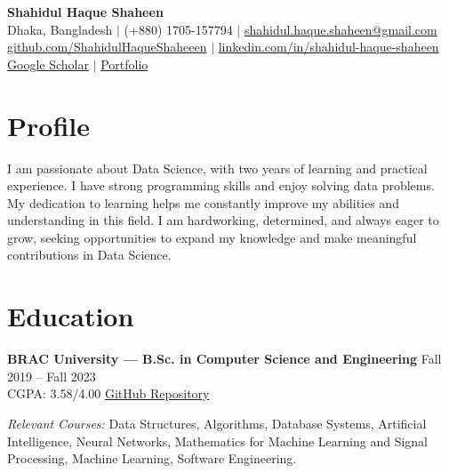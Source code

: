 \documentclass[11.5pt,a4paper]{article}
\begin{document}
\begin{center}
    {\headingfont\Huge \bfseries Shahidul Haque Shaheen}\\[10pt]
    {\normalsize
      Dhaka, Bangladesh \quad $\vert$ \quad
      (+880) 1705-157794 \quad $\vert$ \quad
      \href{mailto:shahidul.haque.shaheen@gmail.com}{shahidul.haque.shaheen@gmail.com} \\[5pt]
      \href{https://github.com/ShahidulHaqueShaheeen}{github.com/ShahidulHaqueShaheeen} \quad $\vert$ \quad
      \href{https://linkedin.com/in/shahidul-haque-shaheen}{linkedin.com/in/shahidul-haque-shaheen} \\[5pt]
      \href{https://scholar.google.com/citations?hl=en&authuser=1&user=9gLv524AAAAJ}{Google Scholar} \quad $\vert$ \quad
      \href{https://shahidulhaqueshaheeen.github.io/}{Portfolio}
    }
\end{center}

\vspace{6pt}

\section*{Profile}

I am passionate about Data Science, with two years of learning and practical experience. I have strong programming skills and enjoy solving data problems. My dedication to learning helps me constantly improve my abilities and understanding in this field. I am hardworking, determined, and always eager to grow, seeking opportunities to expand my knowledge and make meaningful contributions in Data Science.

\section*{Education}

\noindent\textbf{BRAC University --- B.Sc. in Computer Science and Engineering} \hfill \textcolor{subtext}{Fall 2019 -- Fall 2023}\\
CGPA: 3.58/4.00 \hfill \textcolor{subtext}{\href{https://shahidulhaqueshaheeen.github.io/Academic-Documents/}{GitHub Repository}}\par
\vspace{4pt}
\textit{Relevant Courses:} Data Structures, Algorithms, Database Systems, Artificial Intelligence, Neural Networks, Mathematics for Machine Learning and Signal Processing, Machine Learning, Software Engineering.
\end{document}
